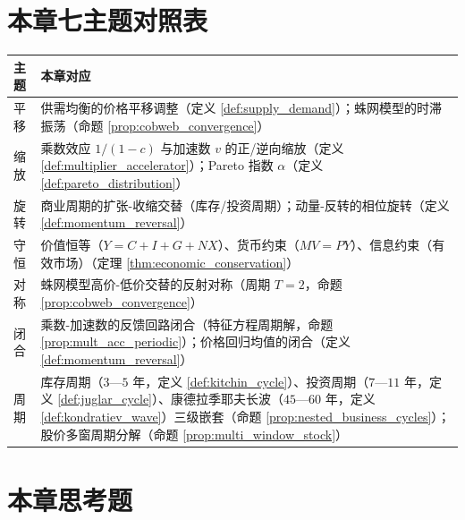 \section*{本章七主题对照表}

\begin{center}
\begin{tabular}{>{\centering\arraybackslash}p{2.2cm}>{\centering\arraybackslash}p{10.5cm}}
\toprule
主题 & 本章对应 \\
\midrule
平移 & 供需均衡的价格平移调整（定义 \ref{def:supply_demand}）；蛛网模型的时滞振荡（命题 \ref{prop:cobweb_convergence}） \\
缩放 & 乘数效应 $1/(1-c)$ 与加速数 $v$ 的正/逆向缩放（定义 \ref{def:multiplier_accelerator}）；Pareto 指数 $\alpha$（定义 \ref{def:pareto_distribution}） \\
旋转 & 商业周期的扩张-收缩交替（库存/投资周期）；动量-反转的相位旋转（定义 \ref{def:momentum_reversal}） \\
守恒 & 价值恒等（$Y=C+I+G+NX$）、货币约束（$MV=PY$）、信息约束（有效市场）（定理 \ref{thm:economic_conservation}） \\
对称 & 蛛网模型高价-低价交替的反射对称（周期 $T=2$，命题 \ref{prop:cobweb_convergence}） \\
闭合 & 乘数-加速数的反馈回路闭合（特征方程周期解，命题 \ref{prop:mult_acc_periodic}）；价格回归均值的闭合（定义 \ref{def:momentum_reversal}） \\
周期 & 库存周期（$3$—$5$ 年，定义 \ref{def:kitchin_cycle}）、投资周期（$7$—$11$ 年，定义 \ref{def:juglar_cycle}）、康德拉季耶夫长波（$45$—$60$ 年，定义 \ref{def:kondratiev_wave}）三级嵌套（命题 \ref{prop:nested_business_cycles}）；股价多窗周期分解（命题 \ref{prop:multi_window_stock}） \\
\bottomrule
\end{tabular}
\end{center}

\section*{本章思考题}

